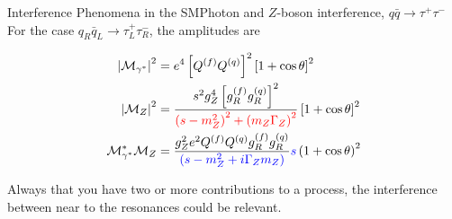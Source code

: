 \documentclass{../bredelebeamer}
\begin{document}
\begin{frame}{Interference Phenomena in the SM}{Photon and $Z$-boson interference, $q \bar q \longrightarrow \tau^+ \tau^- $}
    For the case $q_R \bar q_L \longrightarrow \tau_L^+ \tau_R^-$, the amplitudes are
    \begin{minipage}{0.65\textwidth}
        \begin{equation}
            \begin{aligned}
                \abs{\mathcal{M}_{\gamma^*}}^2          & = e^4\left[Q^{(f)} Q^{(q)}\right]^2\left[1+\cos \theta\right]^2                                                                      \\
                \abs{\mathcal{M}_{Z}}^2                 & = \frac{s^2 g_Z^4\left[g_R^{(f)} g_R^{(q)}\right]^2}{\textcolor{red}{\left(s-m_Z^2\right)^2+\left(m_Z \Gamma_Z\right)^2}}\left[1+\cos \theta\right]^2 \\
                \mathcal{M}_{\gamma^*}^*\mathcal{M}_{Z} & = \frac{g_Z^2 e^2 Q^{(f)} Q^{(q)} g_R^{(f)} g_R^{(q)}}{\textcolor{blue}{\left(s-m_Z^2+i \Gamma_Zm_Z\right)}} \textcolor{blue}{s}\left(1+\cos \theta\right)^2 \notag
            \end{aligned}
        \end{equation}
    \end{minipage}
    \hfill
    \begin{minipage}{0.33\textwidth}
    \end{minipage}\pause
		\begin{center}
			{ \large
			Always that you have two or more contributions to a process, the interference between near to the resonances could be relevant.
			}
		\end{center}
\end{frame}    
\end{document}

